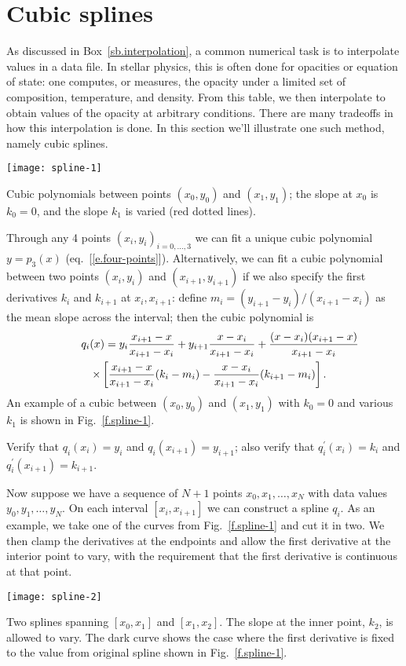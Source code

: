 \section{Cubic splines}
As discussed in Box~\ref{sb.interpolation}, a common numerical task is to interpolate values in a data file. In stellar physics, this is often done for opacities or equation of state: one computes, or measures, the opacity under a limited set of composition, temperature, and density. From this table, we then interpolate to obtain values of the opacity at arbitrary conditions. There are many tradeoffs in how this interpolation is done. In this section we'll illustrate one such method, namely cubic splines.

\begin{marginfigure}
\texttt{[image: spline-1]}
\caption{\label{f.spline-1}Cubic polynomials between points $(x_{0},y_{0})$ and $(x_{1},y_{1})$; the slope at $x_{0}$ is $k_{0}=0$, and the slope $k_{1}$ is varied (red dotted lines).}
\end{marginfigure}
Through any 4 points $(x_{i},y_{i})_{i=0,\ldots,3}$ we can fit a unique cubic polynomial $y=p_{3}(x)$ (eq.~[\ref{e.four-points}]).  Alternatively, we can fit a cubic polynomial between two points $(x_{i},y_{i})$ and $(x_{i+1},y_{i+1})$ if we also specify the first derivatives $k_{i}$ and $k_{i+1}$ at $x_{i},x_{i+1}$: define $m_{i} = (y_{i+1}-y_{i})/(x_{i+1}-x_{i})$ as the mean slope across the interval; then the cubic polynomial is
\begin{eqnarray}
\lefteqn{q_{i}(x) =   y_{i}\frac{x_{i+1}-x}{x_{i+1}-x_{i}} 
		   + y_{i+1}\frac{x-x_{i}}{x_{i+1}-x_{i}}
		   + \frac{(x-x_{i})(x_{i+1}-x)}{x_{i+1}-x_{i}}} && \nonumber\\
		   && \times\left[\frac{x_{i+1}-x}{x_{i+1}-x_{i}}(k_{i}-m_{i})
		       -\frac{x-x_{i}}{x_{i+1}-x_{i}}(k_{i+1}-m_{i})\right].
\label{e.spline}
\end{eqnarray}
An example of a cubic between $(x_{0},y_{0})$ and $(x_{1},y_{1})$ with $k_{0}=0$ and various $k_{1}$ is shown in Fig.~\ref{f.spline-1}.

\begin{exercisebox}
Verify that $q_{i}(x_{i}) = y_{i}$ and $q_{i}(x_{i+1}) = y_{i+1}$; also verify that $q^{\prime}_{i}(x_{i}) = k_{i}$ and $q^{\prime}_{i}(x_{i+1}) = k_{i+1}$.
\end{exercisebox}

Now suppose we have a sequence of $N+1$ points $x_{0},x_{1},\ldots,x_{N}$ with data values $y_{0},y_{1},\ldots,y_{N}$. On each interval $[x_{i},x_{i+1}]$ we can construct a spline $q_{i}$. As an example, we take one of the curves from Fig.~\ref{f.spline-1} and cut it in two. We then clamp the derivatives at the endpoints and allow the first derivative at the interior point to vary, with the requirement that the first derivative is continuous at that point. 
\begin{marginfigure}
\texttt{[image: spline-2]}
\caption{\label{f.spline-2} Two splines spanning $[x_{0},x_{1}]$ and $[x_{1},x_{2}]$. The slope at the inner point, $k_{2}$, is allowed to vary. The dark curve shows the case where the first derivative is fixed to the value from original spline shown in Fig.~\ref{f.spline-1}.}
\end{marginfigure}

